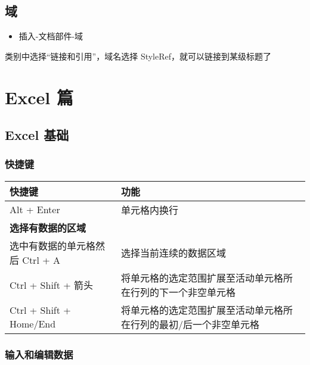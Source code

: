 \documentclass[]{ctexbook}
\providecommand{\tightlist}{%
  \setlength{\itemsep}{0pt}\setlength{\parskip}{0pt}}
\begin{document}
\hypertarget{ux57df}{%
\chapter{域}\label{ux57df}}

\begin{itemize}
\tightlist
\item
  插入-文档部件-域
\end{itemize}

类别中选择``链接和引用''，域名选择 StyleRef，就可以链接到某级标题了

\cleardoublepage

\hypertarget{part-excel-ux7bc7}{%
\part{Excel 篇}\label{part-excel-ux7bc7}}

\hypertarget{chapter-Excel-basic}{%
\chapter{Excel 基础}\label{chapter-Excel-basic}}

\hypertarget{ux5febux6377ux952e}{%
\section{快捷键}\label{ux5febux6377ux952e}}

\begin{longtable}[]{@{}ll@{}}
\toprule
快捷键 & 功能\tabularnewline
\midrule
\endhead
Alt + Enter & 单元格内换行\tabularnewline
\textbf{选择有数据的区域} &\tabularnewline
选中有数据的单元格然后 Ctrl + A & 选择当前连续的数据区域\tabularnewline
Ctrl + Shift + 箭头 & 将单元格的选定范围扩展至活动单元格所在行列的下一个非空单元格\tabularnewline
Ctrl + Shift + Home/End & 将单元格的选定范围扩展至活动单元格所在行列的最初/后一个非空单元格\tabularnewline
\bottomrule
\end{longtable}

\hypertarget{ux8f93ux5165ux548cux7f16ux8f91ux6570ux636e}{%
\section{输入和编辑数据}\label{ux8f93ux5165ux548cux7f16ux8f91ux6570ux636e}}
\end{document}
